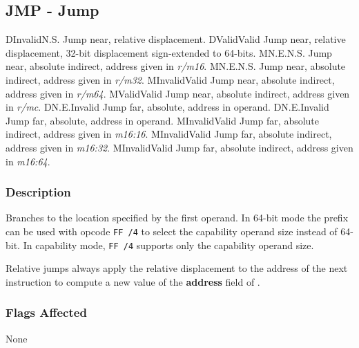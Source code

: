 \clearpage
{}
{}
\subsection*{JMP - Jump}

\begin{x86opcodetable}
  {D}{Invalid}{N.S.}
  {Jump near, relative displacement.}
  {D}{Valid}{Valid}
  {Jump near, relative displacement, 32-bit displacement sign-extended
    to 64-bits.}
  {M}{N.E.}{N.S.}
  {Jump near, absolute indirect, address given in \emph{r/m16}.}
  {M}{N.E.}{N.S.}
  {Jump near, absolute indirect, address given in \emph{r/m32}.}
  {M}{Invalid}{Valid}
  {Jump near, absolute indirect, address given in \emph{r/m64}.}
  {M}{Valid}{Valid}
  {Jump near, absolute indirect, address given in \emph{r/mc}.}
  {D}{N.E.}{Invalid}
  {Jump far, absolute, address in operand.}
  {D}{N.E.}{Invalid}
  {Jump far, absolute, address in operand.}
  {M}{Invalid}{Valid}
  {Jump far, absolute indirect, address given in \emph{m16:16}.}
  {M}{Invalid}{Valid}
  {Jump far, absolute indirect, address given in \emph{m16:32}.}
  {M}{Invalid}{Valid}
  {Jump far, absolute indirect, address given in \emph{m16:64}.}
\end{x86opcodetable}

\begin{x86opentable}
\end{x86opentable}

\subsubsection*{Description}

Branches to the location specified by the first operand.  In 64-bit
mode the  prefix can be used with opcode \texttt{FF /4}
to select the capability operand size instead of 64-bit.  In
capability mode, \texttt{FF /4} supports only the capability operand
size.

Relative jumps always apply the relative displacement to the address
of the next instruction to compute a new value of the \textbf{address}
field of \CIP{}.

\subsubsection*{Flags Affected}

None
